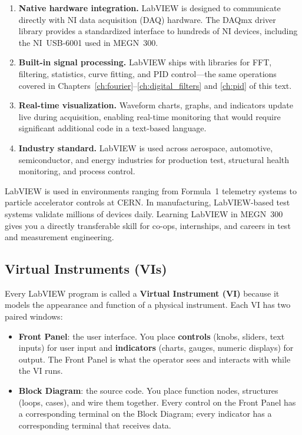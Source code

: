 \begin{enumerate}[leftmargin=1.5em]
\item \textbf{Native hardware integration.} LabVIEW is designed to communicate directly with NI data acquisition (DAQ) hardware. The DAQmx driver library provides a standardized interface to hundreds of NI devices, including the NI~USB-6001 used in MEGN~300.
\item \textbf{Built-in signal processing.} LabVIEW ships with libraries for FFT, filtering, statistics, curve fitting, and PID control---the same operations covered in Chapters~\ref{ch:fourier}--\ref{ch:digital_filters} and \ref{ch:pid} of this text.
\item \textbf{Real-time visualization.} Waveform charts, graphs, and indicators update live during acquisition, enabling real-time monitoring that would require significant additional code in a text-based language.
\item \textbf{Industry standard.} LabVIEW is used across aerospace, automotive, semiconductor, and energy industries for production test, structural health monitoring, and process control.
\end{enumerate}

\begin{industrybox}
LabVIEW is used in environments ranging from Formula~1 telemetry systems to particle accelerator controls at CERN. In manufacturing, LabVIEW-based test systems validate millions of devices daily. Learning LabVIEW in MEGN~300 gives you a directly transferable skill for co-ops, internships, and careers in test and measurement engineering.
\end{industrybox}

\subsection{Virtual Instruments (VIs)}

Every LabVIEW program is called a \textbf{Virtual Instrument (VI)} because it models the appearance and function of a physical instrument. Each VI has two paired windows:

\begin{itemize}[leftmargin=1.5em]
\item \textbf{Front Panel}: the user interface. You place \textbf{controls} (knobs, sliders, text inputs) for user input and \textbf{indicators} (charts, gauges, numeric displays) for output. The Front Panel is what the operator sees and interacts with while the VI runs.
\item \textbf{Block Diagram}: the source code. You place function nodes, structures (loops, cases), and wire them together. Every control on the Front Panel has a corresponding terminal on the Block Diagram; every indicator has a corresponding terminal that receives data.
\end{itemize}

